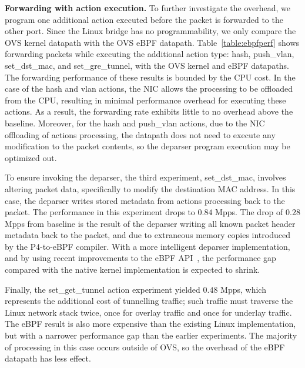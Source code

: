 \documentclass[10pt]{sigplanconf}
\begin{document}
\textbf{Forwarding with action execution.}
To further investigate the overhead,
we program one additional action executed before the packet is
forwarded to the other port.  Since the Linux bridge has no
programmability, we only compare the OVS kernel datapath with the OVS eBPF
datapath.  Table~\ref{table:ebpfperf} shows forwarding
packets while executing the additional action type: hash, push\_vlan,
set\_dst\_mac, and set\_gre\_tunnel, with the OVS kernel and eBPF datapaths.
The forwarding performance of these results is bounded by the CPU cost.
In the case of the hash and vlan actions, the NIC allows the processing
to be offloaded from the CPU, resulting in minimal performance overhead for
executing these actions.  As a result, the forwarding rate exhibits little
to no overhead above the baseline.
Moreover, for the hash and push\_vlan actions, due to the NIC offloading of
actions processing, the datapath does not need to execute any modification to
the packet contents, so the deparser program execution may be optimized out.

To ensure invoking the deparser, the third experiment, set\_dst\_mac, involves
altering packet data, specifically to modify the destination MAC address. In
this case, the deparser writes stored metadata from actions processing back to
the packet. The performance in this experiment drops to $0.84$ Mpps. The drop
of $0.28$ Mpps from baseline is the result of the deparser writing all known
packet header metadata back to the packet, and due to extraneous memory copies
introduced by the P4-to-eBPF compiler. With a more intelligent deparser
implementation, and by using recent improvements to the eBPF
API~\cite{dpa1,dpa2}, the performance gap compared with the native kernel
implementation is expected to shrink.

Finally, the set\_get\_tunnel action experiment yielded $0.48$ Mpps, which
represents the additional cost of tunnelling traffic; such traffic must
traverse the Linux network stack twice, once for overlay traffic and
once for underlay traffic. The eBPF result is also more expensive than
the existing Linux implementation, but with a narrower performance gap
than the earlier experiments. The majority of processing in this case occurs
outside of OVS, so the overhead of the eBPF datapath has less effect.
\end{document}
